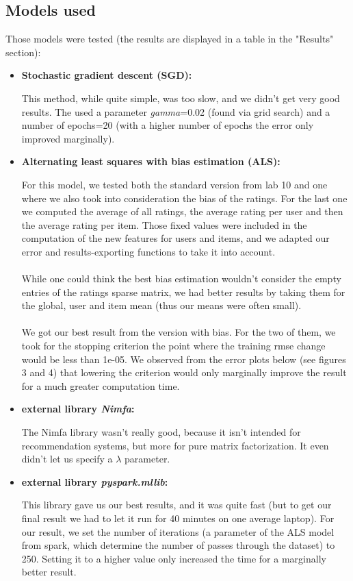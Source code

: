 \documentclass[a4paper]{article}
\begin{document}
\subsection{Models used}
Those models were tested (the results are displayed in a table in the "Results" section):

\begin{itemize}
\item \textbf{Stochastic gradient descent (SGD):}  

This method, while quite simple, was too slow, and we didn't get very good results.
The used a parameter \textit{gamma}=0.02 (found via grid search) and a number of epochs=20 (with a higher number of epochs the error only improved marginally).
\item \textbf{Alternating least squares with bias estimation (ALS):}  

For this model, we tested both the standard version from lab 10 and one where we also took into consideration the bias of the ratings. For the last one we computed the average of all ratings, the average rating per user and then the average rating per item. Those fixed values were included in the computation of the new features for users and items, and we adapted our error and results-exporting functions to take it into account.  
\paragraph{}
While one could think the best bias estimation wouldn't consider the empty entries of the ratings sparse matrix, we had better results by taking them for the global, user and item mean (thus our means were often small).
\paragraph{}
We got our best result from the version with bias. For the two of them, we took for the stopping criterion the point where the training rmse change would be less than 1e-05. We observed from the error plots below (see figures 3 and 4) that lowering the criterion would only marginally improve the result for a much greater computation time. 
\item \textbf{external library \textit{Nimfa}:}  

The Nimfa library wasn't really good, because it isn't intended for recommendation systems, but more for pure matrix factorization. It even didn't let us specify a \(\lambda\) parameter.
\item \textbf{external library \textit{pyspark.mllib}:}  

This library gave us our best results, and it was quite fast (but to get our final result we had to let it run for 40 minutes on one average laptop).
For our result, we set the number of iterations (a parameter of the ALS model from spark, which determine the number of passes through the dataset) to 250. Setting it to a higher value only increased the time for a marginally better result. 
\end{itemize}
\end{document}
